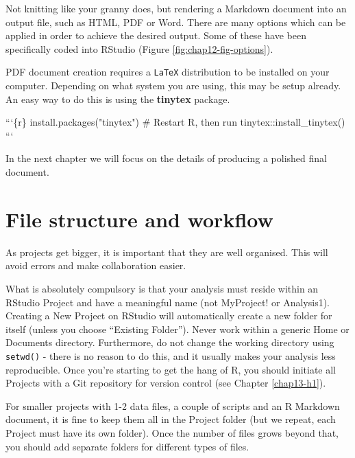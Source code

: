 \documentclass[
  12pt,
  krantz2]{krantz}
\makeatletter
\newenvironment{Shaded}{\begin{snugshade}}{\end{snugshade}}
\newcommand{\BaseNTok}[1]{\textcolor[rgb]{0.00,0.00,0.81}{#1}}
\newenvironment{kframe}{%
\medskip{}
\setlength{\fboxsep}{.8em}
 \def\at@end@of@kframe{}%
 \ifinner\ifhmode%
  \def\at@end@of@kframe{\end{minipage}}%
  \begin{minipage}{\columnwidth}%
 \fi\fi%
 \def\FrameCommand##1{\hskip\@totalleftmargin \hskip-\fboxsep
 \colorbox{shadecolor}{##1}\hskip-\fboxsep
     \hskip-\linewidth \hskip-\@totalleftmargin \hskip\columnwidth}%
 \MakeFramed {\advance\hsize-\width
   \@totalleftmargin\z@ \linewidth\hsize
   \@setminipage}}%
 {\par\unskip\endMakeFramed%
 \at@end@of@kframe}
\renewenvironment{Shaded}{\begin{kframe}}{\end{kframe}}
\makeatother
\begin{document}
Not knitting like your granny does, but rendering a Markdown document into an output file, such as HTML, PDF or Word.
There are many options which can be applied in order to achieve the desired output.
Some of these have been specifically coded into RStudio (Figure \ref{fig:chap12-fig-options}).

PDF document creation requires a \texttt{LaTeX} distribution to be installed on your computer.
Depending on what system you are using, this may be setup already.
An easy way to do this is using the \textbf{tinytex} package.

\begin{Shaded}
\begin{Highlighting}[]
\BaseNTok{```\{r\}}
\BaseNTok{install.packages("tinytex")}
\BaseNTok{# Restart R, then run}
\BaseNTok{tinytex::install_tinytex()}
\BaseNTok{```}
\end{Highlighting}
\end{Shaded}

In the next chapter we will focus on the details of producing a polished final document.

\hypertarget{file-structure-and-workflow}{%
\section{File structure and workflow}\label{file-structure-and-workflow}}


As projects get bigger, it is important that they are well organised.
This will avoid errors and make collaboration easier.

What is absolutely compulsory is that your analysis must reside within an RStudio Project and have a meaningful name (not MyProject! or Analysis1).
Creating a New Project on RStudio will automatically create a new folder for itself (unless you choose ``Existing Folder'').
Never work within a generic Home or Documents directory.
Furthermore, do not change the working directory using \texttt{setwd()} - there is no reason to do this, and it usually makes your analysis less reproducible.
Once you're starting to get the hang of R, you should initiate all Projects with a Git repository for version control (see Chapter \ref{chap13-h1}).

For smaller projects with 1-2 data files, a couple of scripts and an R Markdown document, it is fine to keep them all in the Project folder (but we repeat, each Project must have its own folder).
Once the number of files grows beyond that, you should add separate folders for different types of files.
\end{document}
